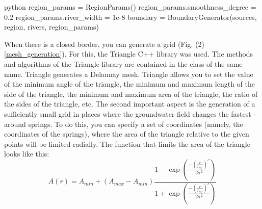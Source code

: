 \documentclass[]{pracamgr}
\begin{document}
      \begin{mintedbox}{python}
        region_params = RegionParams()
        region_params.smoothness_degree = 0.2
        region_params.river_width = 1e-8
        boundary = BoundaryGenerator(sources, region, rivers, region_params)\end{mintedbox}

      When there is a closed border, you can generate a grid (Fig. (2) \ref{mesh_generation}). For this, the Triangle C++ library \cite{szewczuk1996triangle} was used. The methods and algorithms of the Triangle library are contained in the class of the same name. Triangle generates a Delaunay mesh. Triangle allows you to set the value of the minimum angle of the triangle, the minimum and maximum length of the side of the triangle, the minimum and maximum area of the triangle, the ratio of the sides of the triangle, etc. The second important aspect is the generation of a sufficiently small grid in places where the groundwater field changes the fastest - around springs. To do this, you can specify a set of coordinates (namely, the coordinates of the springs), where the area of the triangle relative to the given points will be limited radially. The function that limits the area of the triangle looks like this:
      \begin{equation}
        A(r) = A_{min} + (A_{max} - A_{min}) \frac{1 - \exp{(\frac{-(\frac{r}{r_{ref}})^{e}}{2 \sigma^2})}}{1 + \exp{(\frac{-(\frac{r}{r_{ref}})^{e}}{2 \sigma^2})}} 
      \end{equation}
\end{document}
